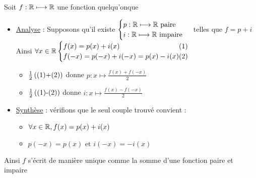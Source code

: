 \begin{corr}
	Soit \(f : \mathbb{R} \longmapsto \mathbb{R} \) une fonction quelqu'onque
	\begin{itemize}
		\item \underline{Analyse} :  Supposons qu'il existe \(\begin{cases}
			      p:\mathbb{R} \longmapsto \mathbb{R} \text{ paire} \\
			      i:\mathbb{R} \longmapsto \mathbb{R} \text{ impaire}
		      \end{cases}\) telles que \(f = p + i\) \\
		      Ainsi \(\forall x \in \R \begin{cases}
			      f(x) = p(x) + i(x) \hfill (1)                  \\
			      f(-x) = p(-x) + i(-x) = p(x) - i(x) \hfill (2) \\
		      \end{cases}\) \\
		      \begin{itemize}
			      \item\(\frac{1}{2}\left(\text{(1)+(2)}\right)\) donne \(p:x\mapsto \frac{f(x)+f(-x)}{2}\) \\
			      \item \(\frac{1}{2}\left(\text{(1)-(2)}\right)\) donne \(i:x\mapsto \frac{f(x)-f(-x)}{2}\) \\
		      \end{itemize}
		\item \underline{Synthèse} : vérifions que le seul couple trouvé convient :
		      \begin{itemize}
			      \item \(\forall x \in \mathbb{R}, f(x) = p(x)+i(x)\)\\
			      \item \(p(-x) = p(x) \text{ et } i(-x) = -i(x)\)\\
		      \end{itemize}
	\end{itemize}
	Ainsi \(f\) s'écrit de manière unique comme la somme d'une fonction paire et impaire
\end{corr}

